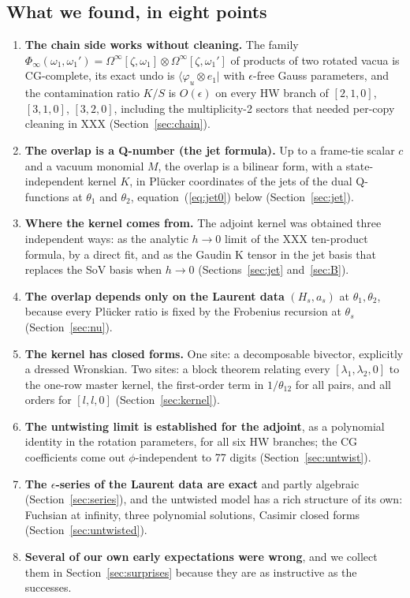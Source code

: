 \documentclass[11pt]{article}
\begin{document}
\subsection{What we found, in eight points}\label{sec:eight}

\begin{enumerate}
\item \textbf{The chain side works without cleaning.} The family $\Phi_\infty(\omega_1,\omega_1')=\Omega^\infty[\zeta,\omega_1]\otimes\Omega^\infty[\zeta,\omega_1']$ of products of two rotated vacua is CG-complete, its exact undo is $\langle\varphi_u\otimes e_1|$ with $\epsilon$-free Gauss parameters, and the contamination ratio $K/S$ is $O(\epsilon)$ on every HW branch of $[2,1,0]$, $[3,1,0]$, $[3,2,0]$, including the multiplicity-2 sectors that needed per-copy cleaning in XXX (Section~\ref{sec:chain}).
\item \textbf{The overlap is a Q-number (the jet formula).} Up to a frame-tie scalar $c$ and a vacuum monomial $M$, the overlap is a bilinear form, with a state-independent kernel $K$, in Plücker coordinates of the jets of the dual Q-functions at $\theta_1$ and $\theta_2$, equation~(\ref{eq:jet0}) below (Section~\ref{sec:jet}).
\item \textbf{Where the kernel comes from.} The adjoint kernel was obtained three independent ways: as the analytic $h\to0$ limit of the XXX ten-product formula, by a direct fit, and as the Gaudin K tensor in the jet basis that replaces the SoV basis when $h\to0$ (Sections~\ref{sec:jet} and~\ref{sec:B}).
\item \textbf{The overlap depends only on the Laurent data} $(H_s,a_s)$ at $\theta_1,\theta_2$, because every Plücker ratio is fixed by the Frobenius recursion at $\theta_s$ (Section~\ref{sec:nu}).
\item \textbf{The kernel has closed forms.} One site: a decomposable bivector, explicitly a dressed Wronskian.
Two sites: a block theorem relating every $[\lambda_1,\lambda_2,0]$ to the one-row master kernel, the first-order term in $1/\theta_{12}$ for all pairs, and all orders for $[l,l,0]$ (Section~\ref{sec:kernel}).
\item \textbf{The untwisting limit is established for the adjoint}, as a polynomial identity in the rotation parameters, for all six HW branches; the CG coefficients come out $\phi$-independent to 77 digits (Section~\ref{sec:untwist}).
\item \textbf{The $\epsilon$-series of the Laurent data are exact} and partly algebraic (Section~\ref{sec:series}), and the untwisted model has a rich structure of its own: Fuchsian at infinity, three polynomial solutions, Casimir closed forms (Section~\ref{sec:untwisted}).
\item \textbf{Several of our own early expectations were wrong}, and we collect them in Section~\ref{sec:surprises} because they are as instructive as the successes.
\end{enumerate}
\end{document}
